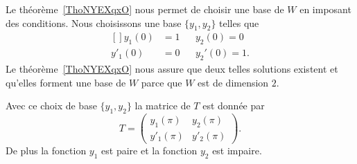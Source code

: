 Le théorème~\ref{ThoNYEXqxO} nous permet de choisir une base de \( W\) en imposant des conditions. Nous choisissons une base \( \{ y_1,y_2 \}\) telles que
\begin{equation}
    \begin{aligned}[]
        y_1(0)&=1       &&  y_2(0)=0\\
        y'_1(0)&=0      &&  y_2'(0)=1.
    \end{aligned}
\end{equation}
Le théorème~\ref{ThoNYEXqxO} nous assure que deux telles solutions existent et qu'elles forment une base de \( W\) parce que \( W\) est de dimension \( 2\).

\begin{lemma}   \label{IVLzNaU}
    Avec ce choix de base \( \{ y_1,y_2 \}\) la matrice de \( T\) est donnée par
    \begin{equation}
        T=\begin{pmatrix}
            y_1(\pi)    &   y_2(\pi)    \\
            y'_1(\pi)    &   y'_2(\pi)
        \end{pmatrix}.
    \end{equation}
    De plus la fonction \( y_1\) est paire et la fonction \( y_2\) est impaire.
\end{lemma}


